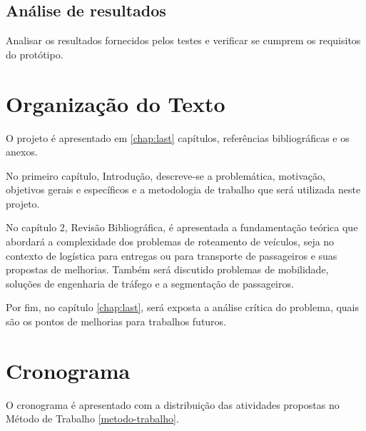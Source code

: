 \subsection{Análise de resultados}
Analisar os resultados fornecidos pelos testes e verificar se cumprem os requisitos do protótipo.

\section{Organização do Texto}
O projeto é apresentado em \ref{chap:last} capítulos, referências bibliográficas e os anexos.

No primeiro capítulo, Introdução, descreve-se a problemática, motivação, objetivos gerais e específicos e a metodologia de trabalho que será utilizada neste projeto. 

No capítulo 2, Revisão Bibliográfica, é apresentada a fundamentação teórica que
abordará a complexidade dos problemas de roteamento de veículos, seja no contexto de logística para entregas ou para transporte de passageiros e suas propostas de melhorias. Também será discutido problemas de mobilidade, soluções de engenharia de tráfego e a segmentação de passageiros.

Por fim, no capítulo \ref{chap:last}, será exposta a análise crítica do problema, quais são os pontos de melhorias para trabalhos futuros. 


\section{Cronograma}
O cronograma é apresentado com a distribuição das atividades propostas no Método de Trabalho \ref{metodo-trabalho}.

 